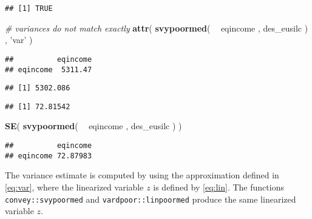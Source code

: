 \documentclass[]{book}
\newenvironment{Shaded}{\begin{snugshade}}{\end{snugshade}}
\newcommand{\CommentTok}[1]{\textcolor[rgb]{0.56,0.35,0.01}{\textit{#1}}}
\newcommand{\KeywordTok}[1]{\textcolor[rgb]{0.13,0.29,0.53}{\textbf{#1}}}
\newcommand{\NormalTok}[1]{#1}
\newcommand{\OperatorTok}[1]{\textcolor[rgb]{0.81,0.36,0.00}{\textbf{#1}}}
\newcommand{\StringTok}[1]{\textcolor[rgb]{0.31,0.60,0.02}{#1}}
\begin{document}
\begin{verbatim}
## [1] TRUE
\end{verbatim}

\begin{Shaded}
\begin{Highlighting}[]
\CommentTok{# variances do not match exactly}
\KeywordTok{attr}\NormalTok{( }\KeywordTok{svypoormed}\NormalTok{( }\OperatorTok{~}\StringTok{ }\NormalTok{eqincome , des_eusilc ) , }\StringTok{'var'}\NormalTok{ )}
\end{Highlighting}
\end{Shaded}

\begin{verbatim}
##          eqincome
## eqincome  5311.47
\end{verbatim}

\begin{Shaded}
\end{Shaded}

\begin{verbatim}
## [1] 5302.086
\end{verbatim}

\begin{Shaded}
\end{Shaded}

\begin{verbatim}
## [1] 72.81542
\end{verbatim}

\begin{Shaded}
\begin{Highlighting}[]
\KeywordTok{SE}\NormalTok{( }\KeywordTok{svypoormed}\NormalTok{( }\OperatorTok{~}\StringTok{ }\NormalTok{eqincome , des_eusilc ) )}
\end{Highlighting}
\end{Shaded}

\begin{verbatim}
##          eqincome
## eqincome 72.87983
\end{verbatim}

The variance estimate is computed by using the approximation defined in \eqref{eq:var}, where the linearized variable \(z\) is defined by \eqref{eq:lin}. The functions \texttt{convey::svypoormed} and \texttt{vardpoor::linpoormed} produce the same linearized variable \(z\).
\end{document}
